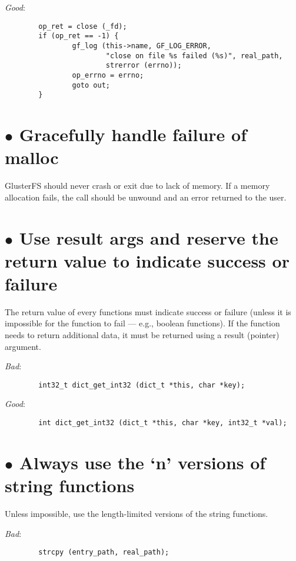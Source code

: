 \documentclass{article}[12pt]
\begin{document}
\textsl{Good}:

\begin{verbatim}
        op_ret = close (_fd);
        if (op_ret == -1) {
                gf_log (this->name, GF_LOG_ERROR,
                        "close on file %s failed (%s)", real_path,
                        strerror (errno));
                op_errno = errno;
                goto out;
        }
\end{verbatim}


\section*{$\bullet$ Gracefully handle failure of malloc}
GlusterFS should never crash or exit due to lack of memory. If a
memory allocation fails, the call should be unwound and an error
returned to the user.

\section*{$\bullet$ Use result args and reserve the return value to indicate success or failure}
The return value of every functions must indicate success or failure (unless
it is impossible for the function to fail --- e.g., boolean functions). If
the function needs to return additional data, it must be returned using a
result (pointer) argument.

\vspace{2ex}
\textsl{Bad}:

\begin{verbatim}
        int32_t dict_get_int32 (dict_t *this, char *key);
\end{verbatim}

\textsl{Good}:

\begin{verbatim}
        int dict_get_int32 (dict_t *this, char *key, int32_t *val);
\end{verbatim}

\section*{$\bullet$ Always use the `n' versions of string functions}
Unless impossible, use the length-limited versions of the string functions.

\vspace{2ex}
\textsl{Bad}:

\begin{verbatim}
        strcpy (entry_path, real_path);
\end{verbatim}
\end{document}
